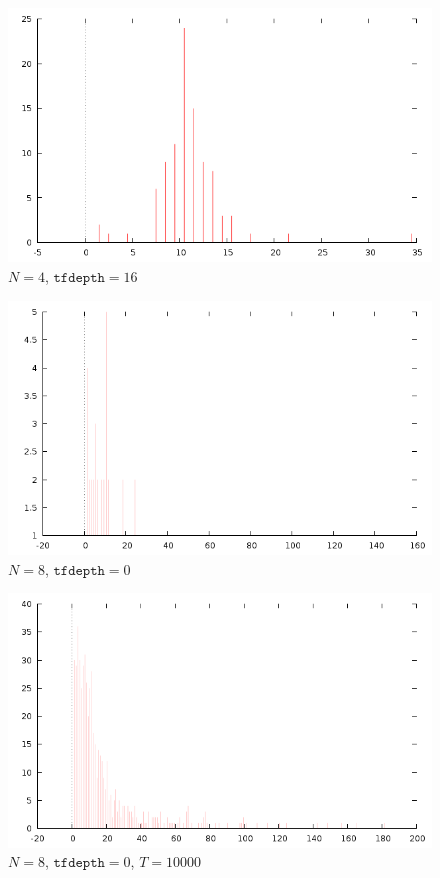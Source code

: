 \documentclass[12pt]{article}
\begin{document}
\begin{figure}[H]
\centering
\caption{$N=4$, $\texttt{tfdepth}=16$}
\includegraphics[scale=0.6]{times4-16.png}
\end{figure} 

\begin{figure}[H]
\centering
\caption{$N=8$,  $\texttt{tfdepth}=0$}
\includegraphics[scale=0.6]{times8-0.png}
\end{figure} 

\begin{figure}[H]
\centering
\caption{$N=8$, $\texttt{tfdepth}=0$, $T=10000$}
\includegraphics[scale=0.6]{times8-0-10000.png}
\end{figure} 
\end{document}
